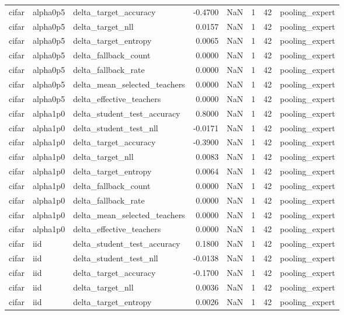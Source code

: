 \begin{tabular}{lllrrrll}
cifar & alpha0p5 & delta\_target\_accuracy & -0.4700 & NaN & 1 & 42 & pooling\_expert \\
cifar & alpha0p5 & delta\_target\_nll & 0.0157 & NaN & 1 & 42 & pooling\_expert \\
cifar & alpha0p5 & delta\_target\_entropy & 0.0065 & NaN & 1 & 42 & pooling\_expert \\
cifar & alpha0p5 & delta\_fallback\_count & 0.0000 & NaN & 1 & 42 & pooling\_expert \\
cifar & alpha0p5 & delta\_fallback\_rate & 0.0000 & NaN & 1 & 42 & pooling\_expert \\
cifar & alpha0p5 & delta\_mean\_selected\_teachers & 0.0000 & NaN & 1 & 42 & pooling\_expert \\
cifar & alpha0p5 & delta\_effective\_teachers & 0.0000 & NaN & 1 & 42 & pooling\_expert \\
cifar & alpha1p0 & delta\_student\_test\_accuracy & 0.8000 & NaN & 1 & 42 & pooling\_expert \\
cifar & alpha1p0 & delta\_student\_test\_nll & -0.0171 & NaN & 1 & 42 & pooling\_expert \\
cifar & alpha1p0 & delta\_target\_accuracy & -0.3900 & NaN & 1 & 42 & pooling\_expert \\
cifar & alpha1p0 & delta\_target\_nll & 0.0083 & NaN & 1 & 42 & pooling\_expert \\
cifar & alpha1p0 & delta\_target\_entropy & 0.0064 & NaN & 1 & 42 & pooling\_expert \\
cifar & alpha1p0 & delta\_fallback\_count & 0.0000 & NaN & 1 & 42 & pooling\_expert \\
cifar & alpha1p0 & delta\_fallback\_rate & 0.0000 & NaN & 1 & 42 & pooling\_expert \\
cifar & alpha1p0 & delta\_mean\_selected\_teachers & 0.0000 & NaN & 1 & 42 & pooling\_expert \\
cifar & alpha1p0 & delta\_effective\_teachers & 0.0000 & NaN & 1 & 42 & pooling\_expert \\
cifar & iid & delta\_student\_test\_accuracy & 0.1800 & NaN & 1 & 42 & pooling\_expert \\
cifar & iid & delta\_student\_test\_nll & -0.0138 & NaN & 1 & 42 & pooling\_expert \\
cifar & iid & delta\_target\_accuracy & -0.1700 & NaN & 1 & 42 & pooling\_expert \\
cifar & iid & delta\_target\_nll & 0.0036 & NaN & 1 & 42 & pooling\_expert \\
cifar & iid & delta\_target\_entropy & 0.0026 & NaN & 1 & 42 & pooling\_expert \\

\end{tabular}
